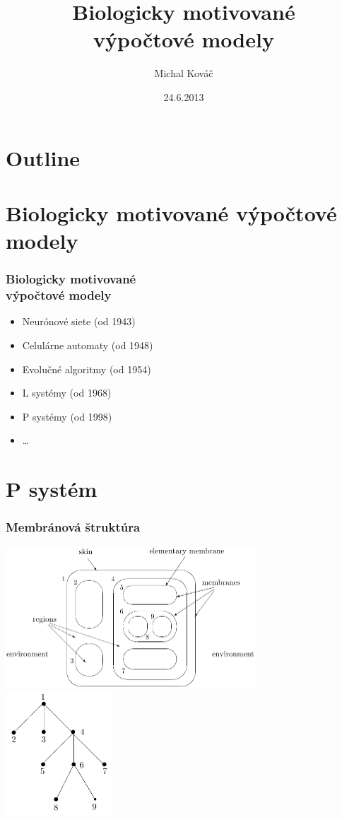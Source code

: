 \documentclass{beamer}
\title{Biologicky motivované\\výpočtové modely}
\author{Michal Kováč}
\institute{FMFI UK}
\date{24.6.2013}
\begin{document}
\begin{frame}[t]
\titlepage
\end{frame}

\section*{Outline}
\begin{frame}
\tableofcontents
\end{frame}

\section{Biologicky motivované výpočtové modely} %
\label{sec:biologicky_motivovane_vypoctove_modely}

\begin{frame}[t]\frametitle{Biologicky motivované\\výpočtové modely}
\begin{itemize}
  \item Neurónové siete (od 1943)
  \item Celulárne automaty (od 1948)
  \item Evolučné algoritmy (od 1954)
  \item L systémy (od 1968)
  \item P systémy (od 1998)
  \item \dots

\end{itemize}
\end{frame}


\section{P systém} %
\label{sec:membranov_systemy}


\begin{frame}[t]\frametitle{Membránová štruktúra}
\includegraphics[width=0.7\textwidth]{membrane_structure.png}
\hfill
\includegraphics[width=0.3\textwidth]{membrane_tree.png}
\end{frame}
\end{document}
